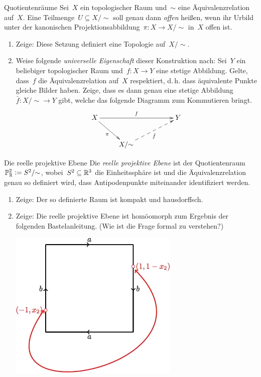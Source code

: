 \documentclass{uebblatt}
\begin{document}

\begin{aufgabe}{Quotientenräume}
Sei~$X$ ein topologischer Raum und~$\sim$ eine Äquivalenzrelation auf~$X$. Eine
Teilmenge~$U \subseteq X/{\sim}$ soll genau dann \emph{offen} heißen, wenn ihr Urbild
unter der kanonischen Projektionsabbildung~$\pi : X \to X/{\sim}$ in~$X$ offen ist.
\begin{enumerate}
\item Zeige: Diese Setzung definiert eine Topologie auf~$X/{\sim}$.
\item Weise folgende \emph{universelle Eigenschaft} dieser Konstruktion nach:
Sei~$Y$ ein beliebiger topologischer Raum und~$f : X \to Y$ eine stetige
Abbildung. Gelte, dass~$f$ die Äquivalenzrelation auf~$X$ respektiert, d.\,h.
dass äquivalente Punkte gleiche Bilder haben. Zeige, dass es dann genau eine
stetige Abbildung~$\bar f : X/{\sim} \to Y$ gibt, welche das folgende Diagramm
zum Kommutieren bringt.
\[ \xymatrix{
  X \ar[rd]_{\pi} \ar[rrr]^f &&& Y \\
  & X/{\sim} \ar@{-->}[rru]_{\bar f}
} \]
\end{enumerate}
\end{aufgabe}

\begin{aufgabe}{Die reelle projektive Ebene}
Die \emph{reelle projektive Ebene} ist der Quotientenraum~$\mathbb{P}^2_{\mathbb{R}} \vcentcolon=
S^2/{\sim}$, wobei~$S^2 \subseteq \mathbb{R}^3$ die Einheitssphäre ist und die
Äquivalenzrelation genau so definiert wird, dass Antipodenpunkte miteinander
identifiziert werden.
\begin{enumerate}
\item Zeige: Der so definierte Raum ist kompakt und hausdorffsch.
\item Zeige: Die reelle projektive Ebene ist homöomorph zum Ergebnis der
folgenden Bastelanleitung. (Wie ist die Frage formal zu verstehen?)
\begin{center}
  \vspace{0.5em}
  \includegraphics[scale=0.4]{reelle-projektive-ebene}
\end{center}
\end{enumerate}
\end{aufgabe}
\end{document}
